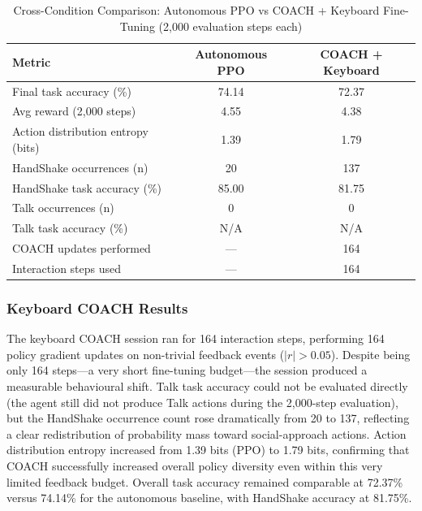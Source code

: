 \documentclass[../report.tex]{subfiles}
\begin{document}
    \begin{table}[t]
        \centering
        \caption{Cross-Condition Comparison: Autonomous PPO vs COACH + Keyboard Fine-Tuning (2,000 evaluation steps each)}
        \label{tab:coach-comparison}
        \begin{tabular}{lcc}
            \toprule
            \textbf{Metric} & \textbf{Autonomous PPO} & \textbf{COACH + Keyboard} \\
            \midrule
            Final task accuracy (\%)          & 74.14  & 72.37  \\
            Avg reward (2,000 steps)          & 4.55   & 4.38   \\
            Action distribution entropy (bits) & 1.39  & 1.79   \\
            HandShake occurrences (n)          & 20     & 137    \\
            HandShake task accuracy (\%)       & 85.00  & 81.75  \\
            Talk occurrences (n)               & 0      & 0      \\
            Talk task accuracy (\%)            & N/A    & N/A    \\
            COACH updates performed            & ---    & 164    \\
            Interaction steps used             & ---    & 164    \\
            \bottomrule
        \end{tabular}
    \end{table}

    \subsubsection{Keyboard COACH Results}

    The keyboard COACH session ran for 164 interaction steps, performing 164 policy gradient updates on non-trivial feedback events ($|r| > 0.05$). Despite being only 164 steps---a very short fine-tuning budget---the session produced a measurable behavioural shift. Talk task accuracy could not be evaluated directly (the agent still did not produce Talk actions during the 2,000-step evaluation), but the HandShake occurrence count rose dramatically from 20 to 137, reflecting a clear redistribution of probability mass toward social-approach actions. Action distribution entropy increased from 1.39 bits (PPO) to 1.79 bits, confirming that COACH successfully increased overall policy diversity even within this very limited feedback budget. Overall task accuracy remained comparable at 72.37\% versus 74.14\% for the autonomous baseline, with HandShake accuracy at 81.75\%.
\end{document}
